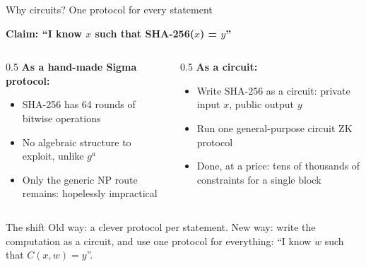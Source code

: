 \ifdefined\PRESENTATION\else\PassOptionsToClass{handout}{beamer}\fi\documentclass[aspectratio=169, lualatex]{beamer}
\begin{document}
\begin{frame}{Why circuits? One protocol for every statement}
	\begin{center}
		\textbf{Claim: ``I know $x$ such that SHA-256($x$) = $y$''}
	\end{center}
	\begin{columns}[c]
		\begin{column}{0.5\textwidth}
			\textbf{As a hand-made Sigma protocol:}
			\begin{itemize}
				\item SHA-256 has 64 rounds of bitwise operations
				\item No algebraic structure to exploit, unlike $g^a$
				\item Only the generic NP route remains: hopelessly impractical
			\end{itemize}
		\end{column}
		\begin{column}{0.5\textwidth}
			\textbf{As a circuit:}
			\begin{itemize}
				\item Write SHA-256 as a circuit: private input $x$, public output $y$
				\item Run one general-purpose circuit ZK protocol
				\item Done, at a price: tens of thousands of constraints for a single block
			\end{itemize}
		\end{column}
	\end{columns}
	\begin{alertblock}{The shift}
		Old way: a clever protocol per statement. New way: write the computation as a circuit, and use one protocol for everything: ``I know $w$ such that $C(x, w) = y$''.
	\end{alertblock}
\end{frame}
\end{document}
